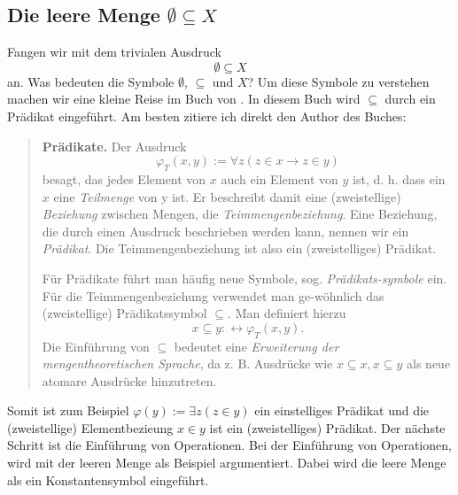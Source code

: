 \documentclass[11pt, a4paper]{article}
\begin{document}
\subsection{Die leere Menge $\emptyset\subseteq X$}
Fangen wir mit dem trivialen Ausdruck \[ \emptyset \subseteq X \] an. Was
bedeuten die Symbole $\emptyset$, $\subseteq$ und $X$? Um diese Symbole zu
verstehen machen wir eine kleine Reise im Buch von \cite{Ebbinghaus2003}. In
diesem Buch wird $\subseteq$ durch ein Prädikat eingeführt. Am besten zitiere
ich direkt den Author des Buches:
\begin{quote}
    \textbf{Prädikate.} Der Ausdruck
    \[
        \varphi_T(x,y):=\forall z(z\in x \rightarrow z\in y)
    \]
    besagt, das jedes Element von $x$ auch ein Element von $y$ ist, d. h. dass
    ein $x$ eine \textit{Teilmenge} von y ist. Er beschreibt damit eine
    (zweistellige) \textit{Beziehung} zwischen Mengen, die
    \textit{Teimmengenbeziehung}. Eine Beziehung, die durch einen Ausdruck
    beschrieben werden kann, nennen wir ein \textit{Prädikat}. Die
    Teimmengenbeziehung ist also ein (zweistelliges) Prädikat.

    Für Prädikate führt man häufig neue Symbole, sog.
    \textit{Prädikats-symbole} ein. Für die Teimmengenbeziehung verwendet man
    ge-wöhnlich das (zweistellige) Prädikatssymbol $\subseteq$. Man definiert
    hierzu
    \[
        x \subseteq y :\leftrightarrow \varphi_T(x,y).
    \]
    Die Einführung von $\subseteq$ bedeutet eine \textit{Erweiterung der
    mengentheoretischen Sprache}, da z. B. Ausdrücke wie $x \subseteq x,
    x\subseteq y$ als neue atomare Ausdrücke hinzutreten.
\end{quote}
Somit ist zum Beispiel $\varphi(y) := \exists z(z\in y)$ ein einstelliges
Prädikat und die (zweistellige) Elementbezieung $x\in y$ ist ein
(zweistelliges) Prädikat. Der nächste Schritt ist die Einführung von
Operationen. Bei der Einführung von Operationen, wird mit der leeren Menge als
Beispiel argumentiert. Dabei wird die leere Menge als ein Konstantensymbol
eingeführt.
\end{document}
